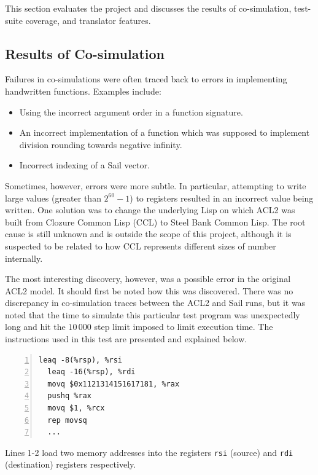 \documentclass[a4paper,12pt,twoside,openright]{report}
\begin{document}
This section evaluates the project and discusses the results of co-simulation, test-suite coverage, and translator features.

\subsection{Results of Co-simulation}

Failures in co-simulations were often traced back to errors in implementing handwritten functions.  Examples include:

\begin{itemize}
  \item Using the incorrect argument order in a function signature.
  \item An incorrect implementation of a function which was supposed to implement division rounding towards negative infinity.
  \item Incorrect indexing of a Sail vector.
\end{itemize}

Sometimes, however, errors were more subtle.  In particular, attempting to write large values (greater than $2^{60} -1$) to registers resulted in an incorrect value being written.  One solution was to change the underlying Lisp on which ACL2 was built from Clozure Common Lisp (CCL) to Steel Bank Common Lisp.  The root cause is still unknown and is outside the scope of this project, although it is suspected to be related to how CCL represents different sizes of number internally.

The most interesting discovery, however, was a possible error in the original ACL2 model.  It should first be noted how this was discovered.  There was no discrepancy in co-simulation traces between the ACL2 and Sail runs, but it was noted that the time to simulate this particular test program was unexpectedly long and hit the $10\,000$ step limit imposed to limit execution time.  The instructions used in this test are presented and explained below.

\begin{minipage}{\linewidth}
\begin{lstlisting}[numbers=left]
  leaq -8(%rsp), %rsi
  leaq -16(%rsp), %rdi
  movq $0x1121314151617181, %rax
  pushq %rax
  movq $1, %rcx
  rep movsq
  ...
\end{lstlisting}
\end{minipage}

Lines 1-2 load two memory addresses into the registers \texttt{rsi} (source) and \texttt{rdi} (destination) registers respectively.
\end{document}
